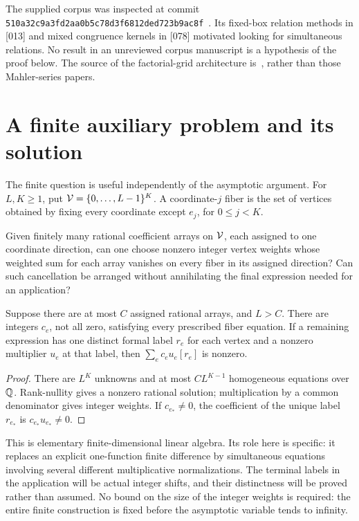 The supplied corpus was inspected at commit
\nolinkurl{510a32c9a3fd2aa0b5c78d3f6812ded723b9ac8f}~\cite{Corpus}.
Its fixed-box relation methods in [013] and mixed congruence kernels in
[078] motivated looking for simultaneous relations. No result in an
unreviewed corpus manuscript is a hypothesis of the proof below.
The source of the factorial-grid architecture is~\cite{TG}, rather
than those Mahler-series papers.

\section{A finite auxiliary problem and its solution}
The finite question is useful independently of the asymptotic argument.
For $L,K\geq1$, put $\mathcal V=\{0,\ldots,L-1\}^K$. A coordinate-$j$
fiber is the set of vertices obtained by fixing every coordinate except
$e_j$, for $0\leq j<K$.

\begin{problem}\label{prob:fiber}
Given finitely many rational coefficient arrays on $\mathcal V$, each assigned
to one coordinate direction, can one choose nonzero integer vertex
weights whose weighted sum for each array vanishes on every fiber
in its assigned direction? Can such cancellation be arranged without
annihilating the final expression needed for an application?
\end{problem}

\begin{lemma}\label{lem:kernel}
Suppose there are at most $C$ assigned rational arrays, and $L>C$.
There are integers $c_e$, not all zero, satisfying every prescribed
fiber equation. If a remaining expression has one distinct formal
label $r_e$ for each vertex and a nonzero multiplier $u_e$ at that
label, then $\sum_e c_eu_e[r_e]$ is nonzero.
\end{lemma}
\begin{proof}
There are $L^K$ unknowns and at most $CL^{K-1}$ homogeneous equations
over $\mathbb Q$. Rank-nullity gives a nonzero rational solution; multiplication
by a common denominator gives integer weights. If $c_{e_*}\ne0$,
the coefficient of the unique label $r_{e_*}$ is $c_{e_*}u_{e_*}\ne0$.
\end{proof}

This is elementary finite-dimensional linear algebra. Its role here is
specific: it replaces an explicit one-function finite difference by
simultaneous equations involving several different multiplicative
normalizations. The terminal labels in the application will be actual
integer shifts, and their distinctness will be proved rather than
assumed. No bound on the size of the integer weights is required:
the entire finite construction is fixed before the asymptotic variable
tends to infinity.

